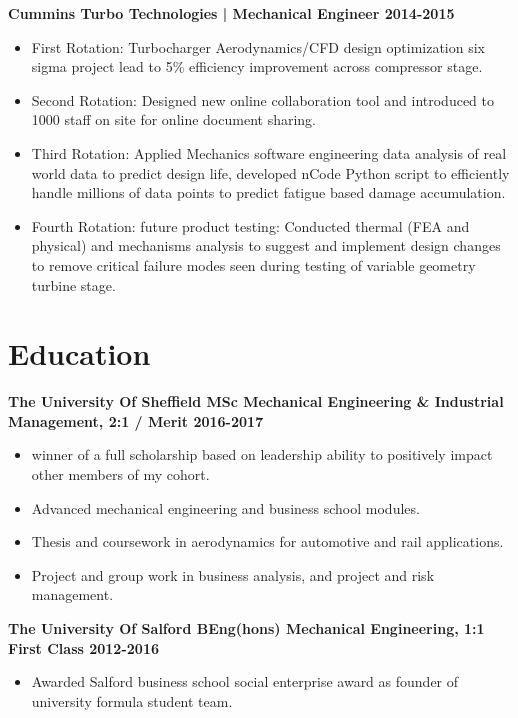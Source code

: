 \documentclass[10pt]{article} %
\begin{document}
{\bf  Cummins Turbo Technologies | Mechanical Engineer \hfill 2014-2015}
\begin{itemize}
\item First Rotation: Turbocharger Aerodynamics/CFD design optimization six sigma project lead to 5\% efficiency improvement across compressor stage.\\
\item Second Rotation: Designed new online collaboration tool and introduced to 1000 staff on site for online document sharing. \\
\item Third Rotation: Applied Mechanics software engineering data analysis of real world data to predict design life, developed nCode Python script to efficiently handle millions of data points to predict fatigue based damage accumulation. \\
\item Fourth Rotation: future product testing: Conducted thermal (FEA and physical) and mechanisms analysis to suggest and implement design changes to remove critical failure modes seen during testing of variable geometry turbine stage.
\end{itemize}
\vspace{-1cm}
\section*{Education}
\vspace{-0.25cm}
{\bf The University Of Sheffield MSc Mechanical Engineering \& Industrial Management, 2:1 / Merit  \hfill 2016-2017} \\
\begin{itemize}
\item winner of a full scholarship based on leadership ability to positively impact other members of my cohort.\\

\item Advanced mechanical engineering and business school modules.\\

\item Thesis and coursework in aerodynamics for automotive and rail applications.\\

\item Project and group work in business analysis, and project and risk management.
\end{itemize}
{\bf The University Of Salford BEng(hons) Mechanical Engineering, 1:1  First Class \hfill 2012-2016 } \\
\begin{itemize}	
\item Awarded Salford business school social enterprise award as founder of university formula student team.
\end{itemize}
\end{document}

